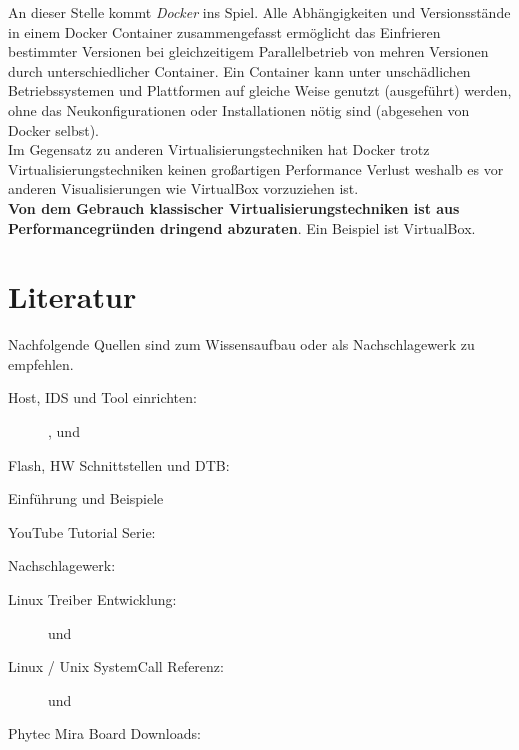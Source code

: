 An dieser Stelle kommt \textit{\gls{Docker}} ins Spiel. Alle Abhängigkeiten und
Versions\-stände in einem \gls{Docker} Container zusammengefasst ermöglicht das
Einfrieren bestimmter Versionen bei gleichzeitigem Parallel\-betrieb von mehren
Versionen durch unterschiedlicher Container. Ein Container kann unter
unschädlichen Betriebssystemen und Plattformen auf gleiche Weise genutzt
(ausgeführt) werden, ohne das Neu\-konfigurationen oder Installationen nötig
sind (abgesehen von Docker selbst).  \\

Im Gegensatz zu anderen Virtualisierungstechniken hat Docker trotz
Virtualisierungstechniken keinen großartigen Performance Verlust weshalb es vor
anderen Visualisierungen wie VirtualBox vorzuziehen ist.  \\

\textbf{Von dem Gebrauch klassischer Virtualisierungstechniken ist aus
    Performance\-gründen dringend abzuraten}. Ein Beispiel ist VirtualBox.


\section{Literatur}%
\label{sec:literatur}

Nachfolgende Quellen sind zum Wissensaufbau oder als Nachschlagewerk zu
empfehlen.

\begin{description}
    \item[Host, IDS und Tool einrichten:] \cite{PhyTec:Development_Guid},
        \cite{Yocto_Eclipse_Plugin} und    \cite{Gonzalez2018:Embedded_Linux_Development_Using_Yocto_Project_Cookbook_2nd}
    \item[Flash, HW Schnittstellen und \acs{DTB}:] \cite[
        \textit{Booting the System} und
        \textit{Updating the System}]{
            Pytec:BSP_Manual}
    \item[Einführung und Beispiele] \cite{Gonzalez2018:Embedded_Linux_Development_Using_Yocto_Project_Cookbook_2nd}
    \item[YouTube Tutorial Serie:] \cite[Live Coding with Yocto
        Project][]{Yocto:YouTube}
    \item[Nachschlagewerk:]\cite{Yocto:Mega_Manual}
    \item[Linux Treiber Entwicklung:] \cite{Quade2015} und \cite{Corbet2005}
    \item[Linux / Unix SystemCall Referenz:] \cite{Kerrisk2010} und \cite{Rago2013}
    \item[Phytec Mira Board Downloads:] \cite{PhyTec:Mira_Downloads}

\end{description}














